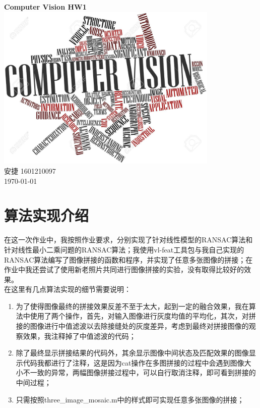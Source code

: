 \documentclass[a4paper, UTF8]{ctexrep}
\begin{document}
	\begin{titlepage}
		\centering
		\vspace{6cm}
		\LARGE{\textbf{Computer Vision HW1}}\\
		\vspace{4cm}
		\includegraphics[width=0.8\textwidth]{cv.jpg}\\
		\vspace{5cm}
		\normalsize{安捷 1601210097}\\
		\normalsize{\today}
	\end{titlepage}
  \section{算法实现介绍}
  	在这一次作业中，我按照作业要求，分别实现了针对线性模型的RANSAC算法和针对线性最小二乘问题的RANSAC算法；我使用vl-feat工具包与我自己实现的RANSAC算法编写了图像拼接的函数和程序，并实现了任意多张图像的拼接；在作业中我还尝试了使用新老照片共同进行图像拼接的实验，没有取得比较好的效果。\\
  	在这里有几点算法实现的细节需要说明：
  	\begin{enumerate}
  		\item 为了使得图像最终的拼接效果反差不至于太大，起到一定的融合效果，我在算法中使用了两个操作，首先，对输入图像进行灰度均值的平均化，其次，对拼接的图像进行中值滤波以去除接缝处的灰度差异，考虑到最终对拼接图像的观察效果，我注释掉了中值滤波的代码；
  		\item 除了最终显示拼接结果的代码外，其余显示图像中间状态及匹配效果的图像显示代码我都进行了注释，这是因为cat操作在多图拼接的过程中会遇到图像大小不一致的异常，两幅图像拼接过程中，可以自行取消注释，即可看到拼接的中间过程；
  		\item 只需按照three\_image\_mosaic.m中的样式即可实现任意多张图像的拼接；
  	\end{enumerate}
\end{document}
